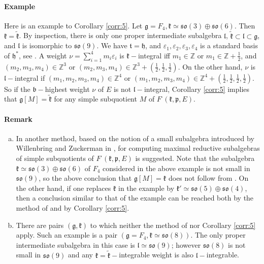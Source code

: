\documentclass[10pt]{amsart}
\newcommand{\bb}{\mathfrak{b}}
\renewcommand{\gg}{\mathfrak{g}}
\newcommand{\hh}{\mathfrak{h}}
\newcommand{\kk}{\mathfrak{k}}
\renewcommand{\ll}{\mathfrak{l}}
\newcommand{\pp}{\mathfrak{p}}
\newcommand{\so}{\mathfrak{so}}
\renewcommand{\tt}{\mathfrak{t}}
\newcommand{\ZZ}{\mathbb{Z}}
\begin{document}
\paragraph{\textbf{Example}} Here is an example to Corollary \ref{corr:5}. Let $\gg = F_4, \kk \simeq \so(3) \oplus \so(6)$. Then $\kk = \tilde{\kk}$. By inspection, there is only one proper intermediate subalgebra $\ll$, $\tilde{\kk} \subset \ll \subset \gg$, and $\ll$ is isomorphic to $\so(9)$. We have $\tt = \hh$, and $\varepsilon_1,\varepsilon_2,\varepsilon_3,\varepsilon_4$ is a standard basis of $\hh^*$, see \cite{Bou}. A weight $\nu = \sum_{i = 1}^{4}m_i\varepsilon_i$ is $\kk-$integral iff $m_1 \in \ZZ$ or $m_1 \in \ZZ + \frac{1}{2}$, and $(m_2,m_3,m_4) \in \ZZ^3$ or $(m_2,m_3,m_4) \in \ZZ^3+(\frac{1}{2},\frac{1}{2},\frac{1}{2})$. On the other hand, $\nu$ is $\ll-$integral if $(m_1,m_2,m_3,m_4) \in \ZZ^4$ or $(m_1,m_2,m_3,m_4) \in \ZZ^4 + (\frac{1}{2},\frac{1}{2},\frac{1}{2},\frac{1}{2})$. So if the $\bb-$highest weight $\nu$ of $E$ is not $\ll-$integral, Corollary \ref{corr:5} implies that $\gg[M] = \tilde{\kk}$ for any simple subquotient $M$ of $F^\cdot(\kk,\pp,E)$. 

\paragraph{\textbf{Remark}}
\begin{enumerate}[a)]

\item In \cite{PZ1} another method, based on the notion of a small subalgebra introduced by Willenbring and Zuckerman in \cite{WZ}, for computing maximal reductive subalgebras of simple subquotients of $F^\cdot(\kk,\pp,E)$ is suggested. Note that the subalgebra $\kk \simeq \so(3) \oplus \so(6)$ of $F_4$ considered in the above example is not small in $\so(9)$, so the above conclusion that $\gg[M] = \kk$ does not follow from \cite{PZ1}. On the other hand, if one replaces $\kk$ in the example by $\kk'\simeq\so(5)\oplus\so(4)$, then a conclusion similar to that of the example can be reached both by the method of \cite{PZ1} and by Corollary \ref{corr:5}.

\item There are pairs $(\gg,\kk)$ to which neither the method of \cite{PZ1} nor Corollary \ref{corr:5} apply. Such an example is a pair $(\gg = F_4, \kk\simeq\so(8))$. The only proper intermediate subalgebra in this case is $\ll \simeq \so(9)$; however $\so(8)$ is not small in $\so(9)$ and any $\kk=\tilde{\kk}-$integrable weight is also $\ll-$integrable.  
\end{enumerate}
\end{document}
